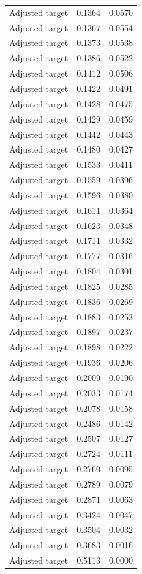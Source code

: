 \begin{table}[htbp]
\begin{tabular}{lll}
Adjusted target & 0.1364 & 0.0570 \\
Adjusted target & 0.1367 & 0.0554 \\
Adjusted target & 0.1373 & 0.0538 \\
Adjusted target & 0.1386 & 0.0522 \\
Adjusted target & 0.1412 & 0.0506 \\
Adjusted target & 0.1422 & 0.0491 \\
Adjusted target & 0.1428 & 0.0475 \\
Adjusted target & 0.1429 & 0.0459 \\
Adjusted target & 0.1442 & 0.0443 \\
Adjusted target & 0.1480 & 0.0427 \\
Adjusted target & 0.1533 & 0.0411 \\
Adjusted target & 0.1559 & 0.0396 \\
Adjusted target & 0.1596 & 0.0380 \\
Adjusted target & 0.1611 & 0.0364 \\
Adjusted target & 0.1623 & 0.0348 \\
Adjusted target & 0.1711 & 0.0332 \\
Adjusted target & 0.1777 & 0.0316 \\
Adjusted target & 0.1804 & 0.0301 \\
Adjusted target & 0.1825 & 0.0285 \\
Adjusted target & 0.1836 & 0.0269 \\
Adjusted target & 0.1883 & 0.0253 \\
Adjusted target & 0.1897 & 0.0237 \\
Adjusted target & 0.1898 & 0.0222 \\
Adjusted target & 0.1936 & 0.0206 \\
Adjusted target & 0.2009 & 0.0190 \\
Adjusted target & 0.2033 & 0.0174 \\
Adjusted target & 0.2078 & 0.0158 \\
Adjusted target & 0.2486 & 0.0142 \\
Adjusted target & 0.2507 & 0.0127 \\
Adjusted target & 0.2724 & 0.0111 \\
Adjusted target & 0.2760 & 0.0095 \\
Adjusted target & 0.2789 & 0.0079 \\
Adjusted target & 0.2871 & 0.0063 \\
Adjusted target & 0.3424 & 0.0047 \\
Adjusted target & 0.3504 & 0.0032 \\
Adjusted target & 0.3683 & 0.0016 \\
Adjusted target & 0.5113 & 0.0000 \\
\bottomrule
\end{tabular}
\end{table}
